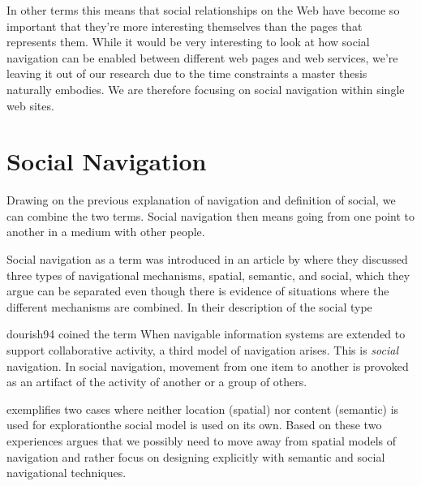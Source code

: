 In other terms this means that social relationships on the Web have become so
important that they're more interesting themselves than the pages that
represents them. While it would be very interesting to look at how social
navigation can be enabled between different web pages and web services,%
we're leaving it out of our research due to the time constraints a master
thesis naturally embodies. We are therefore focusing on social navigation
within single web sites.

\section{Social Navigation}
\label{section:background.social.navigation}

Drawing on the previous explanation of navigation and definition of social, we
can combine the two terms. Social navigation then means going from one point
to another in a medium with other people.

Social navigation as a term was introduced in an article by
\citet{dourish94} where they discussed three types of navigational mechanisms,
spatial, semantic,%
and social, which they argue can be separated even though
there is evidence of situations where the different mechanisms are combined.
In their description of the social type
\begin{fullquote}[\p{1}]{dourish94}{%
  coined the term }
    When navigable information systems are extended to support collaborative
    activity, a third model of navigation arises. This is \emph{social}
    navigation. In social navigation, movement from one item to another is
    provoked as an artifact of the activity of another or a group of others.
\end{fullquote}

\citeauthor{dourish94} exemplifies two cases where neither location
(spatial) nor content (semantic) is used for exploration\dash{}the social
model is used on its own. Based on these two experiences
\citeauthor{dourish94} argues that we possibly need to move away from spatial
models of navigation and rather focus on designing explicitly with semantic
and social navigational techniques.

